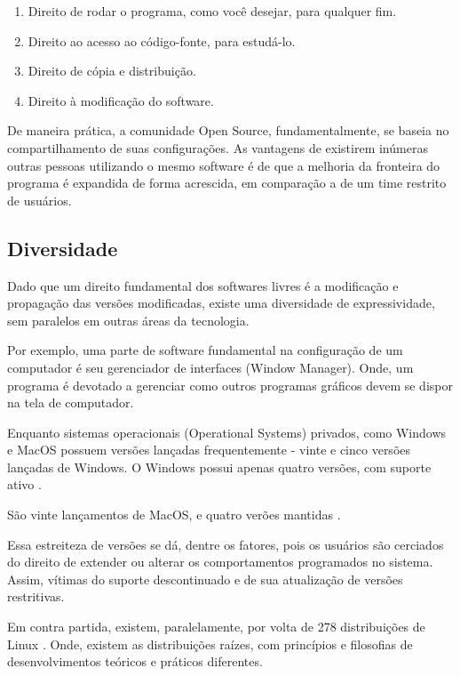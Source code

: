 \documentclass[
12pt,				%
openright,			%
oneside,			%
a4paper,			%
english,			%
french,				%
spanish,			%
brazil,				%
]{abntex2}
\begin{document}
\begin{enumerate}
\item Direito de rodar o programa, como você desejar, para qualquer fim.
\item Direito ao acesso ao código-fonte, para estudá-lo.
\item Direito de cópia e distribuição.
\item Direito à modificação do software.
\end{enumerate}

De maneira prática, a comunidade Open Source, fundamentalmente, se baseia no compartilhamento de suas configurações. As vantagens de existirem inúmeras outras pessoas utilizando o mesmo software é de que a melhoria da fronteira do programa é expandida de forma acrescida, em comparação a de um time restrito de usuários.

\subsection{Diversidade}
\label{sec:diversidade}

Dado que um direito fundamental dos softwares livres é a modificação e propagação das versões modificadas, existe uma diversidade de expressividade, sem paralelos em outras áreas da tecnologia.

Por exemplo, uma parte de software fundamental na configuração de um computador é seu gerenciador de interfaces (Window Manager). Onde, um programa é devotado a gerenciar como outros programas gráficos devem se dispor na tela de computador.

Enquanto sistemas operacionais (Operational Systems) privados, como Windows e MacOS possuem versões lançadas frequentemente - vinte e cinco versões lançadas de Windows. O Windows possui apenas quatro versões, com suporte ativo \cite{wikipedia_2021W}.

São vinte lançamentos de MacOS, e quatro verões mantidas \cite{wikipedia_2021Mac}.

Essa estreiteza de versões se dá, dentre os fatores, pois os usuários são cerciados do direito de extender ou alterar os comportamentos programados no sistema. Assim, vítimas do suporte descontinuado e de sua atualização de versões restritivas.

Em contra partida, existem, paralelamente, por volta de 278 distribuições de Linux \cite{wikipedia_2021Linux}. Onde, existem as distribuições raízes, com princípios e filosofias de desenvolvimentos teóricos e práticos diferentes.
\end{document}
